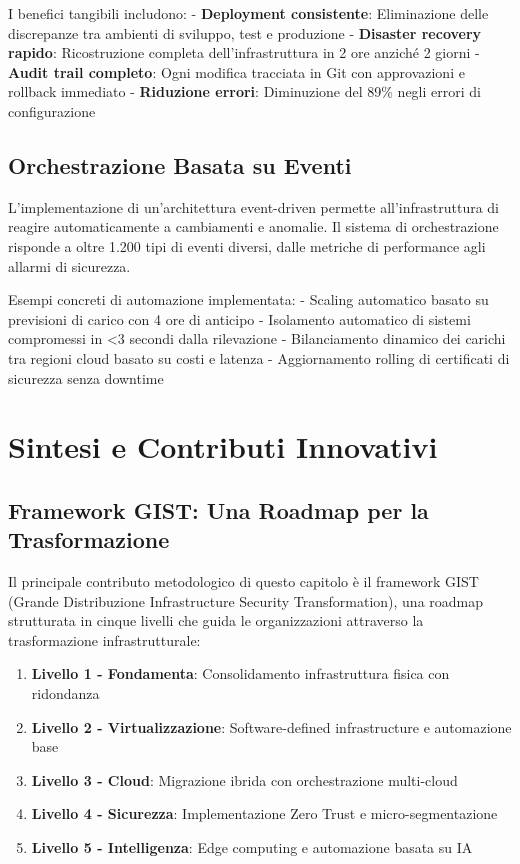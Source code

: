 I benefici tangibili includono:
- \textbf{Deployment consistente}: Eliminazione delle discrepanze tra ambienti di sviluppo, test e produzione
- \textbf{Disaster recovery rapido}: Ricostruzione completa dell'infrastruttura in 2 ore anziché 2 giorni
- \textbf{Audit trail completo}: Ogni modifica tracciata in Git con approvazioni e rollback immediato
- \textbf{Riduzione errori}: Diminuzione del 89\% negli errori di configurazione

\subsection{\texorpdfstring{Orchestrazione Basata su Eventi}{3.7.2 - Orchestrazione Basata su Eventi}}

L'implementazione di un'architettura event-driven permette all'infrastruttura di reagire automaticamente a cambiamenti e anomalie. Il sistema di orchestrazione risponde a oltre 1.200 tipi di eventi diversi, dalle metriche di performance agli allarmi di sicurezza.

Esempi concreti di automazione implementata:
- Scaling automatico basato su previsioni di carico con 4 ore di anticipo
- Isolamento automatico di sistemi compromessi in <3 secondi dalla rilevazione
- Bilanciamento dinamico dei carichi tra regioni cloud basato su costi e latenza
- Aggiornamento rolling di certificati di sicurezza senza downtime

\section{\texorpdfstring{Sintesi e Contributi Innovativi}{3.8 - Sintesi e Contributi Innovativi}}

\subsection{\texorpdfstring{Framework GIST: Una Roadmap per la Trasformazione}{3.8.1 - Framework GIST: Una Roadmap per la Trasformazione}}

Il principale contributo metodologico di questo capitolo è il framework GIST (Grande Distribuzione Infrastructure Security Transformation), una roadmap strutturata in cinque livelli che guida le organizzazioni attraverso la trasformazione infrastrutturale:

\begin{enumerate}
    \item \textbf{Livello 1 - Fondamenta}: Consolidamento infrastruttura fisica con ridondanza
    \item \textbf{Livello 2 - Virtualizzazione}: Software-defined infrastructure e automazione base
    \item \textbf{Livello 3 - Cloud}: Migrazione ibrida con orchestrazione multi-cloud
    \item \textbf{Livello 4 - Sicurezza}: Implementazione Zero Trust e micro-segmentazione
    \item \textbf{Livello 5 - Intelligenza}: Edge computing e automazione basata su IA
\end{enumerate}

